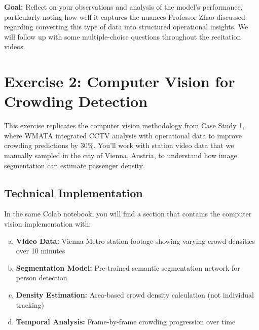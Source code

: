 \documentclass[11pt]{article}
\begin{document}
\noindent\textbf{Goal:} Reflect on your observations and analysis of the model's performance, particularly noting how well it captures the nuances Professor Zhao discussed regarding converting this type of data into structured operational insights. We will follow up with some multiple-choice questions throughout the recitation videos.


\section*{Exercise 2: Computer Vision for Crowding Detection}

\begin{center}
\end{center}

This exercise replicates the computer vision methodology from Case Study 1, where WMATA integrated CCTV analysis with operational data to improve crowding predictions by 30\%. You'll work with station video data that we manually sampled in the city of Vienna, Austria, to understand how image segmentation can estimate passenger density.

\subsection*{Technical Implementation}
In the same Colab notebook, you will find a section that contains the computer vision implementation with:
\begin{enumerate}[(a)]
\item \textbf{Video Data:} Vienna Metro station footage showing varying crowd densities over 10 minutes
\item \textbf{Segmentation Model:} Pre-trained semantic segmentation network for person detection
\item \textbf{Density Estimation:} Area-based crowd density calculation (not individual tracking)
\item \textbf{Temporal Analysis:} Frame-by-frame crowding progression over time
\end{enumerate}
\end{document}
